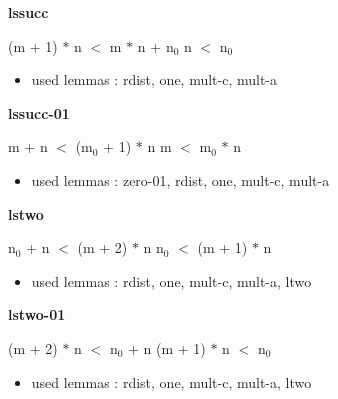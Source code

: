 \documentclass[a4paper]{article}
\begin{document}
{\large\bf lssucc}

\medskip

 \Fol (m + 1) $*$ n $<$ m $*$ n + $\mbox{n}_{0}$ \Equiv n $<$ $\mbox{n}_{0}$

\begin{itemize}


\item       used lemmas  : rdist, one, mult-c, mult-a

\end{itemize}

\medskip

\bigskip

{\large\bf lssucc-01}

\medskip

 \Fol m + n $<$ ($\mbox{m}_{0}$ + 1) $*$ n \Equiv m $<$ $\mbox{m}_{0}$ $*$ n

\begin{itemize}


\item       used lemmas  : zero-01, rdist, one, mult-c, mult-a

\end{itemize}

\medskip

\bigskip

{\large\bf lstwo}

\medskip

 \Fol $\mbox{n}_{0}$ + n $<$ (m + 2) $*$ n \Equiv $\mbox{n}_{0}$ $<$ (m + 1) $*$ n

\begin{itemize}


\item       used lemmas  : rdist, one, mult-c, mult-a, ltwo

\end{itemize}

\medskip

\bigskip

{\large\bf lstwo-01}

\medskip

 \Fol (m + 2) $*$ n $<$ $\mbox{n}_{0}$ + n \Equiv (m + 1) $*$ n $<$ $\mbox{n}_{0}$

\begin{itemize}


\item       used lemmas  : rdist, one, mult-c, mult-a, ltwo

\end{itemize}

\medskip
\end{document}
